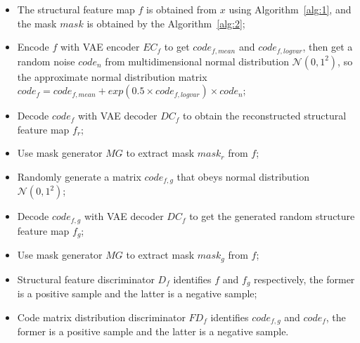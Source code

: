 \documentclass[letterpaper]{article} %
\begin{document}
\begin{itemize}
	\item The structural feature map $f$ is obtained from $x$ using Algorithm~\ref{alg:1}, and the mask $mask$ is obtained by the Algorithm~\ref{alg:2};
	\item Encode $f$ with VAE encoder $EC_f$ to get $code_{f,mean}$ and $code_{f,logvar}$, then get a random noise $code_n$ from multidimensional normal distribution $\mathcal{N}(0,1^2)$, so the approximate normal distribution matrix  $code_f=code_{f,mean}+exp(0.5\times code_{f,logvar})\times code_n$;
	\item Decode $code_f$ with VAE decoder $DC_f$ to obtain the reconstructed structural feature map $f_r$;
	\item Use mask generator $MG$ to extract mask $mask_r$ from $f$;
	\item Randomly generate a matrix $code_{f,g}$ that obeys normal distribution $\mathcal{N}(0,1^2)$;
	\item Decode $code_{f,g}$ with VAE decoder $DC_f$ to get the generated random structure feature map $f_g$;
	\item Use mask generator $MG$ to extract mask $mask_g$ from $f$;
	\item Structural feature discriminator $D_f$ identifies $f$ and $f_g$ respectively, the former is a positive sample and the latter is a negative sample;
	\item Code matrix distribution discriminator $FD_f$ identifies $code_{f,g}$ and $code_f$, the former is a positive sample and the latter is a negative sample.
\end{itemize}
\end{document}
